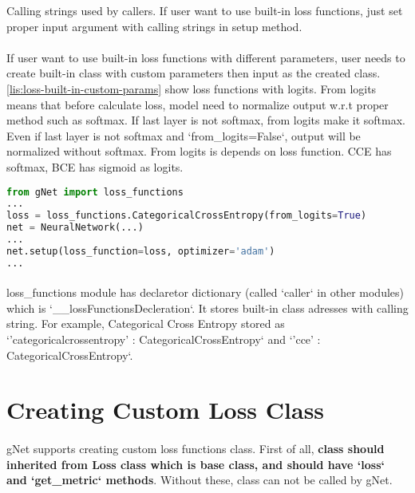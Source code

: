 \documentclass[12pt]{report}
\begin{document}
Calling strings used by callers. If user want to use built-in loss functions, just set proper input argument with calling strings in setup method. 

\paragraph{}
If user want to use built-in loss functions with different parameters, user needs to create built-in class with custom parameters then input as the created class. \ref{lis:loss-built-in-custom-params} show loss functions with logits. From logits means that before calculate loss, model need to normalize output w.r.t proper method such as softmax. If last layer is not softmax, from logits make it softmax. Even if last layer is not softmax and `from\_logits=False`, output will be normalized without softmax. From logits is depends on loss function. CCE has softmax, BCE has sigmoid as logits.


\begin{lstlisting}[language=Python, numbers=none, caption={Built-in loss function with custom parameters.}, label={lis:loss-built-in-custom-params}]
from gNet import loss_functions
...
loss = loss_functions.CategoricalCrossEntropy(from_logits=True)
net = NeuralNetwork(...)
...
net.setup(loss_function=loss, optimizer='adam')
...
\end{lstlisting}

\paragraph{}
loss\_functions module has declaretor dictionary (called `caller` in other modules) which is `\_\_lossFunctionsDecleration`. It stores built-in class adresses with calling string. For example, Categorical Cross Entropy stored as `'categoricalcrossentropy' : CategoricalCrossEntropy` and `'cce' : CategoricalCrossEntropy`.

\section{Creating Custom Loss Class}

\paragraph{}
gNet supports creating custom loss functions class. First of all, \textbf{class should inherited from Loss class which is base class, and should have `loss` and `get\_metric` methods}. Without these, class can not be called by gNet. 
\end{document}
